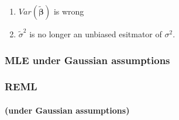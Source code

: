 \documentclass[]{article}
\begin{document}
\begin{enumerate}
\def\labelenumi{\arabic{enumi}.}
\itemsep1pt\parskip0pt
\item
  $Var(\tilde{\boldsymbol{\beta}})$ is wrong
\item
  $\tilde{\sigma}^2$ is no longer an unbiased esitmator of $\sigma^2$.
\end{enumerate}

\subsubsection{MLE under Gaussian
assumptions}\label{mle-under-gaussian-assumptions}

\subsubsection{REML}\label{reml}

\paragraph{(under Gaussian
assumptions)}\label{under-gaussian-assumptions}
\end{document}
